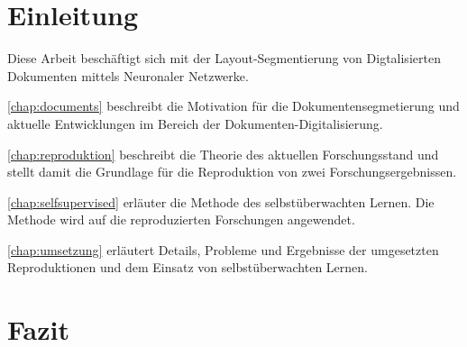 

\section*{Einleitung}
Diese Arbeit beschäftigt sich mit der Layout-Segmentierung von Digtalisierten Dokumenten mittels Neuronaler Netzwerke.

\cref{chap:documents} beschreibt die Motivation für die Dokumentensegmetierung und aktuelle Entwicklungen im
Bereich der Dokumenten-Digitalisierung.

\cref{chap:reproduktion} beschreibt die Theorie des aktuellen Forschungsstand und stellt damit die Grundlage für die Reproduktion von zwei Forschungsergebnissen.

\cref{chap:selfsupervised} erläuter die Methode des selbstüberwachten Lernen. Die Methode wird auf die reproduzierten Forschungen angewendet.

\cref{chap:umsetzung} erläutert Details, Probleme und Ergebnisse der umgesetzten
Reproduktionen und dem Einsatz von selbstüberwachten Lernen.







\section{Fazit}


